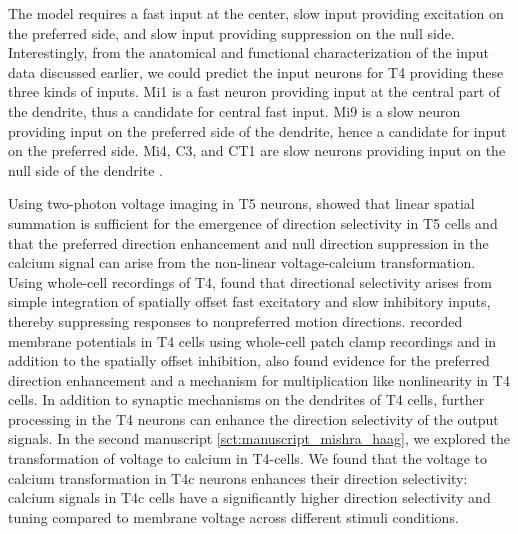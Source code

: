The model requires a fast input at the center, slow input providing excitation on the preferred side, and slow input providing suppression on the null side. Interestingly, from the anatomical and functional characterization of the input data discussed earlier, we could predict the input neurons for T4 providing these three kinds of inputs. Mi1 is a fast neuron providing input at the central part of the dendrite, thus a candidate for central fast input. Mi9 is a slow neuron providing input on the preferred side of the dendrite, hence a candidate for input on the preferred side. Mi4, C3, and CT1 are slow neurons providing input on the null side of the dendrite \parencite{Arenz2017}. 

Using two-photon voltage imaging in T5 neurons, \cite{Wienecke2018} showed that linear spatial summation is sufficient for the emergence of direction selectivity in T5 cells and that the preferred direction enhancement and null direction suppression in the calcium signal can arise from the non-linear voltage-calcium transformation. Using whole-cell recordings of T4, \cite{Gruntman2018} found that directional selectivity arises from simple integration of spatially offset fast excitatory and slow inhibitory inputs, thereby suppressing responses to nonpreferred motion directions. \cite{Groschner2022} recorded membrane potentials in T4 cells using whole-cell patch clamp recordings and in addition to the spatially offset inhibition, also found evidence for the preferred direction enhancement and a mechanism for multiplication like nonlinearity in T4 cells. In addition to synaptic mechanisms on the dendrites of T4 cells, further processing in the T4 neurons can enhance the direction selectivity of the output signals. In the second manuscript \ref{sct:manuscript_mishra_haag}, we explored the transformation of voltage to calcium in T4-cells. We found that the voltage to calcium transformation in T4c neurons enhances their direction selectivity: calcium signals in T4c cells have a significantly higher direction selectivity and tuning compared to membrane voltage across different stimuli conditions. 

